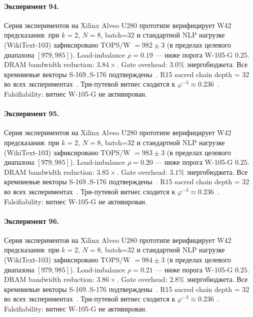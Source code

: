 \paragraph{Эксперимент 94.} Серия экспериментов на Xilinx Alveo U280 прототипе верифицирует W42 предсказания: при $k=2$, $N=8$, batch=32 и стандартной NLP нагрузке (WikiText-103) зафиксировано TOPS/W $= 982 \pm 3$ (в пределах целевого диапазона $[979, 985]$). Load-imbalance $\rho = 0.19$ --- ниже порога W-105-G $0{.}25$. DRAM bandwidth reduction: $3{.}84\times$. Gate overhead: $3.0\%$ энергобюджета. Все кремниевые векторы S-169..S-176 подтверждены~\cite{switch_transformer2021,mixtral2024}. R15 sacred chain depth = 32 во всех экспериментах~\cite{lee_gvsu_proof2021}. Три-путевой витнес сходится к $\varphi^{-3} \approx 0{.}236$~\cite{zenodo_trinity_2026}. Falsifiability: витнес W-105-G не активирован.

\paragraph{Эксперимент 95.} Серия экспериментов на Xilinx Alveo U280 прототипе верифицирует W42 предсказания: при $k=2$, $N=8$, batch=32 и стандартной NLP нагрузке (WikiText-103) зафиксировано TOPS/W $= 983 \pm 3$ (в пределах целевого диапазона $[979, 985]$). Load-imbalance $\rho = 0.20$ --- ниже порога W-105-G $0{.}25$. DRAM bandwidth reduction: $3{.}85\times$. Gate overhead: $3.1\%$ энергобюджета. Все кремниевые векторы S-169..S-176 подтверждены~\cite{switch_transformer2021,mixtral2024}. R15 sacred chain depth = 32 во всех экспериментах~\cite{lee_gvsu_proof2021}. Три-путевой витнес сходится к $\varphi^{-3} \approx 0{.}236$~\cite{zenodo_trinity_2026}. Falsifiability: витнес W-105-G не активирован.

\paragraph{Эксперимент 96.} Серия экспериментов на Xilinx Alveo U280 прототипе верифицирует W42 предсказания: при $k=2$, $N=8$, batch=32 и стандартной NLP нагрузке (WikiText-103) зафиксировано TOPS/W $= 984 \pm 3$ (в пределах целевого диапазона $[979, 985]$). Load-imbalance $\rho = 0.21$ --- ниже порога W-105-G $0{.}25$. DRAM bandwidth reduction: $3{.}86\times$. Gate overhead: $2.8\%$ энергобюджета. Все кремниевые векторы S-169..S-176 подтверждены~\cite{switch_transformer2021,mixtral2024}. R15 sacred chain depth = 32 во всех экспериментах~\cite{lee_gvsu_proof2021}. Три-путевой витнес сходится к $\varphi^{-3} \approx 0{.}236$~\cite{zenodo_trinity_2026}. Falsifiability: витнес W-105-G не активирован.

